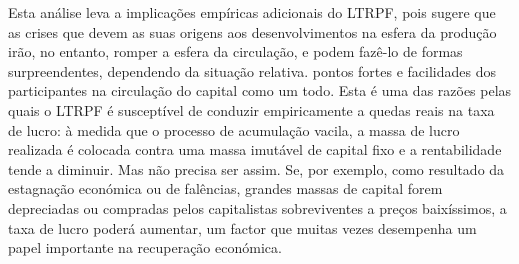  \par 
Esta análise leva a implicações empíricas adicionais do LTRPF, pois sugere que as crises que devem as suas origens aos desenvolvimentos na esfera da produção irão, no entanto, romper a esfera da circulação, e podem fazê-lo de formas surpreendentes, dependendo da situação relativa. pontos fortes e facilidades dos participantes na circulação do capital como um todo. Esta é uma das razões pelas quais o LTRPF é susceptível de conduzir empiricamente a quedas reais na taxa de lucro: à medida que o processo de acumulação vacila, a massa de lucro realizada é colocada contra uma massa imutável de capital fixo e a rentabilidade tende a diminuir. Mas não precisa ser assim. Se, por exemplo, como resultado da estagnação económica ou de falências, grandes massas de capital forem depreciadas ou compradas pelos capitalistas sobreviventes a preços baixíssimos, a taxa de lucro poderá aumentar, um factor que muitas vezes desempenha um papel importante na recuperação económica.
 \par 
